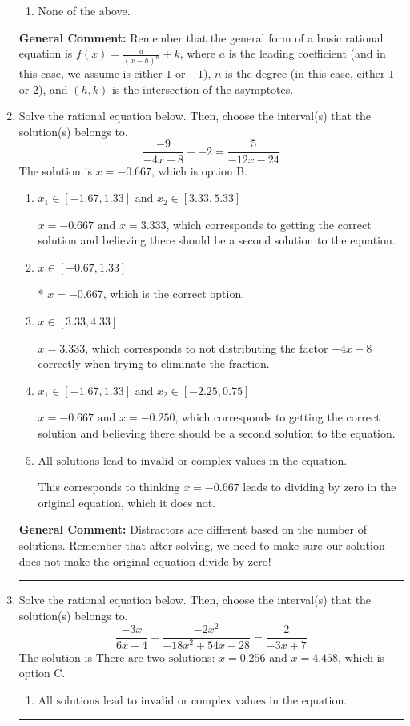 \documentclass{extbook}[14pt]
\newcommand{\litem}[1]{\item #1

\rule{\textwidth}{0.4pt}}
\begin{document}
\begin{enumerate}
{\begin{enumerate}[label=\Alph*.]
\begin{multicols}{2}
\end{multicols}\item None of the above.\end{enumerate}
\textbf{General Comment:} Remember that the general form of a basic rational equation is $ f(x) = \frac{a}{(x-h)^n} + k$, where $a$ is the leading coefficient (and in this case, we assume is either $1$ or $-1$), $n$ is the degree (in this case, either $1$ or $2$), and $(h, k)$ is the intersection of the asymptotes.
}
\litem{
Solve the rational equation below. Then, choose the interval(s) that the solution(s) belongs to.
\[ \frac{-9}{-4x -8} + -2 = \frac{5}{-12x -24} \]The solution is \( x = -0.667 \), which is option B.\begin{enumerate}[label=\Alph*.]
\item \( x_1 \in [-1.67, 1.33] \text{ and } x_2 \in [3.33,5.33] \)

$x = -0.667 \text{ and } x = 3.333$, which corresponds to getting the correct solution and believing there should be a second solution to the equation.
\item \( x \in [-0.67,1.33] \)

* $x = -0.667$, which is the correct option.
\item \( x \in [3.33,4.33] \)

$x = 3.333$, which corresponds to not distributing the factor $-4x -8$ correctly when trying to eliminate the fraction.
\item \( x_1 \in [-1.67, 1.33] \text{ and } x_2 \in [-2.25,0.75] \)

$x = -0.667 \text{ and } x = -0.250$, which corresponds to getting the correct solution and believing there should be a second solution to the equation.
\item \( \text{All solutions lead to invalid or complex values in the equation.} \)

This corresponds to thinking $x = -0.667$ leads to dividing by zero in the original equation, which it does not.
\end{enumerate}

\textbf{General Comment:} Distractors are different based on the number of solutions. Remember that after solving, we need to make sure our solution does not make the original equation divide by zero!
}
\litem{
Solve the rational equation below. Then, choose the interval(s) that the solution(s) belongs to.
\[ \frac{-3x}{6x -4} + \frac{-2x^{2}}{-18x^{2} +54 x -28} = \frac{2}{-3x + 7} \]The solution is \( \text{There are two solutions: } x = 0.256 \text{ and } x = 4.458 \), which is option C.\begin{enumerate}[label=\Alph*.]
\item \( \text{All solutions lead to invalid or complex values in the equation.} \)



\end{enumerate}}
\end{enumerate}
\end{document}
